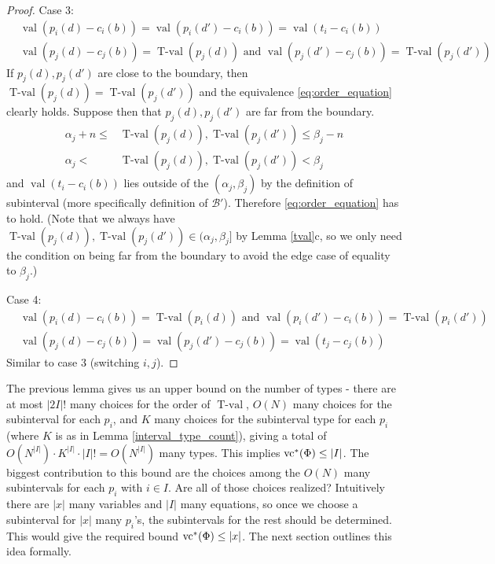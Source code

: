 \documentclass{amsart}
\newcommand{\BB}{\mathscr B}
\DeclareMathOperator{\vval}{val}
\DeclareMathOperator{\tval}{T-val}
\begin{document}
\begin{proof}
 Case 3:
  \begin{align*}
    &\vval (p_i(d) - c_i(b)) = \vval (p_i(d') - c_i(b)) = \vval(t_i - c_i(b)) \\
    &\vval (p_j(d) - c_j(b)) = \tval(p_j(d)) \text{ and } \vval (p_j(d') - c_j(b)) = \tval(p_j(d'))
  \end{align*}
  If $p_j(d), p_j(d')$ are close to the boundary,
  then $\tval(p_j(d)) = \tval(p_j(d'))$ and the equivalence \eqref{eq:order_equation} clearly holds.
  Suppose then that $p_j(d), p_j(d')$ are far from the boundary.
  \begin{align*}
    \alpha_j + n \leq &\tval(p_j(d)), \tval(p_j(d')) \leq \beta_j - n \\
    \alpha_j < &\tval(p_j(d)), \tval(p_j(d')) < \beta_j
  \end{align*}
  and $\vval(t_i - c_i(b))$ lies outside of the $(\alpha_j, \beta_j)$
  by the definition of subinterval (more specifically definition of $\BB'$).
  Therefore \eqref{eq:order_equation} has to hold.
  (Note that we always have $\tval(p_j(d)), \tval(p_j(d')) \in (\alpha_j, \beta_j]$ by Lemma \ref{tval}c, so 
  we only need the condition on being far from the boundary to avoid the edge case of equality to $\beta_j$.)

  Case 4:
  \begin{align*}
    &\vval (p_i(d) - c_i(b)) = \tval(p_i(d)) \text{ and } \vval (p_i(d') - c_i(b)) = \tval(p_i(d')) \\
    &\vval (p_j(d) - c_j(b)) = \vval (p_j(d') - c_j(b)) = \vval(t_j - c_j(b))
  \end{align*}
  Similar to case 3 (switching $i,j$).
\end{proof}



  The previous lemma gives us an upper bound on the number of types - there are at most $|2I|!$ many choices for the order of $\tval$,
  $O(N)$ many choices for the subinterval for each $p_i$,
  and $K$ many choices for the subinterval type for each $p_i$ (where $K$ is as in Lemma \ref{interval_type_count}),
  giving a total of $O(N^{|I|}) \cdot K^{|I|} \cdot |I|! = O(N^{|I|})$ many types.
  This implies $\operatorname{vc}^*(\Phi) \leq |I|$.
  The biggest contribution to this bound are the choices among the $O(N)$ many subintervals for each $p_i$ with $i \in I$.
  Are all of those choices realized?
  Intuitively there are $|x|$ many variables and $|I|$ many equations,
  so once we choose a subinterval for $|x|$ many $p_i$'s, the subintervals for the rest should be determined.
  This would give the required bound $\operatorname{vc}^*(\Phi) \leq |x|$.
  The next section outlines this idea formally.
\end{document}
